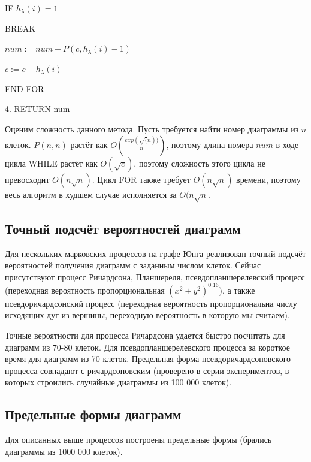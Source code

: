 \documentclass[12pt]{report}
\begin{document}
\hspace{1cm} IF $h_\lambda(i) = 1$

\hspace{2cm} BREAK

\hspace{1cm} $num := num + P(c, h_\lambda(i) - 1)$

\hspace{1cm} $c := c - h_\lambda(i)$

\hspace{0.35cm} END FOR

4. RETURN num

Оценим сложность данного метода. Пусть требуется найти номер диаграммы из $n$ клеток. $P(n, n)$ растёт как $O(\frac{exp(\sqrt(n))}{n})$, поэтому длина номера $num$ в ходе цикла WHILE растёт как $O(\sqrt{c})$, поэтому сложность этого цикла не превосходит $O(n\sqrt{n})$. Цикл FOR также требует $O(n\sqrt{n})$ времени, поэтому весь алгоритм в худшем случае исполняется за $O(n\sqrt{n}$.

\subsection*{Точный подсчёт вероятностей диаграмм}

\hspace{\parindent} Для нескольких марковских процессов на графе Юнга реализован точный подсчёт вероятностей получения диаграмм с заданным числом клеток. Сейчас присутствуют процесс Ричардсона, Планшереля, псевдопланшерелевский процесс (переходная вероятность пропорциональная $(x^2+y^2)^{0.16}$), а также псевдоричардсонский процесс (переходная вероятность пропорциональна числу исходящих дуг из вершины, переходную вероятность в которую мы считаем). 

Точные вероятности для процесса Ричардсона удается быстро посчитать для диаграмм из 70-80 клеток. Для псевдопланшерелевского процесса за короткое время для диаграмм из 70 клеток. Предельная форма псевдоричардсоновского процесса совпадают с ричардсоновским (проверено в серии экспериментов, в которых строились случайные диаграммы из 100 000 клеток).

\subsection*{Предельные формы диаграмм}

\hspace{\parindent} Для описанных выше процессов построены предельные формы (брались диаграммы из 1000 000 клеток). 
\end{document}
